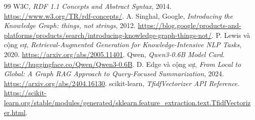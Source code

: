 \documentclass[12pt,a4paper]{report}
\begin{document}
\begin{thebibliography}{99}
 W3C, \textit{RDF 1.1 Concepts and Abstract Syntax}, 2014.
\url{https://www.w3.org/TR/rdf-concepts/}.
 A. Singhal, Google, \textit{Introducing the Knowledge Graph: things, not strings}, 2012.
\url{https://blog.google/products-and-platforms/products/search/introducing-knowledge-graph-things-not/}.
 P. Lewis và cộng sự, \textit{Retrieval-Augmented Generation for Knowledge-Intensive NLP Tasks}, 2020.
\url{https://arxiv.org/abs/2005.11401}.
 Qwen, \textit{Qwen3-0.6B Model Card}.
\url{https://huggingface.co/Qwen/Qwen3-0.6B}.
 D. Edge và cộng sự, \textit{From Local to Global: A Graph RAG Approach to Query-Focused Summarization}, 2024.
\url{https://arxiv.org/abs/2404.16130}.
 scikit-learn, \textit{TfidfVectorizer API Reference}.
\url{https://scikit-learn.org/stable/modules/generated/sklearn.feature_extraction.text.TfidfVectorizer.html}.
\end{thebibliography}
\end{document}
